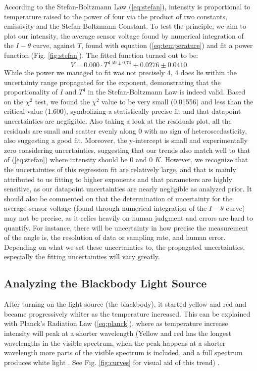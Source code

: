 \documentclass[12pt]{article}
\begin{document}
According to the Stefan-Boltzmann Law (\ref{eq:stefan}), intensity is proportional to temperature raised to the power of four via the product of two constants, emissivity and the Stefan-Boltzmann Constant. To test the principle, we aim to plot our intensity, the average sensor voltage found by numerical integration of the $I-\theta$ curve, against $T$, found with equation (\ref{eq:temperature}) and fit a power function (Fig. \ref{fig:stefan}). 
The fitted function turned out to be:
\begin{equation}
    V=0.000\cdot T^{4.59\pm0.74}+0.0276\pm0.0410
    \label{eq:stefanfit}
\end{equation}
While the power we managed to fit was not precisely 4, 4 does lie within the uncertainty range propagated for the exponent, demonstrating that the proportionality of $I$ and $T^4$ in the Stefan-Boltzmann Law is indeed valid. Based on the $\chi^2$ test, we found the $\chi^2$ value to be very small (0.01556) and less than the critical value (1.600), symbolizing a statistically precise fit and that datapoint uncertainties are negligible. Also taking a look at the residuals plot, all the residuals are small and scatter evenly along 0 with no sign of heteroscedasticity, also suggesting a good fit. Moreover, the y-intercept is small and experimentally zero considering uncertainties, suggesting that our trends also match well to that of (\ref{eq:stefan}) where intensity should be 0 and 0 $K$. However, we recognize that the uncertainties of this regression fit are relatively large, and that is mainly attributed to us fitting to higher exponents and that parameters are highly sensitive, as our datapoint uncertainties are nearly negligible as analyzed prior. It should also be commented on that the determination of uncertainty for the average sensor voltage (found through numerical integration of the $I-\theta$ curve) may not be precise, as it relies heavily on human judgment and errors are hard to quantify. For instance, there will be uncertainty in how precise the measurement of the angle is, the resolution of data or sampling rate, and human error. Depending on what we set these uncertainties to, the propagated uncertainties, especially the fitting uncertainties will vary greatly.

\subsection{Analyzing the Blackbody Light Source}
After turning on the light source (the blackbody), it started yellow and red and became progressively whiter as the temperature increased. This can be explained with Planck's Radiation Law (\ref{eq:planck}), where as temperature increase intensity will peak at a shorter wavelength (Yellow and red has the longest wavelengths in the visible spectrum, when the peak happens at a shorter wavelength more parts of the visible spectrum is included, and a full spectrum produces white light \autocite{Eberly:77}. See Fig. \ref{fig:curves} for visual aid of this trend) \autocite{manuall}. 
\end{document}
